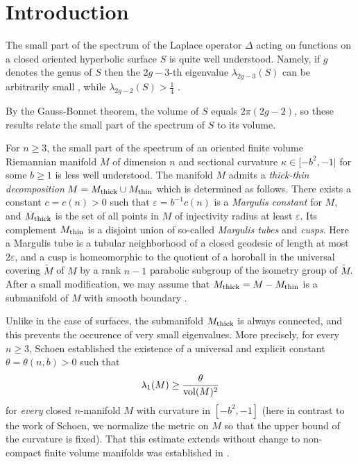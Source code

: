 \documentclass[11pt]{amsart}
\theoremstyle{plain}
\theoremstyle{plain}
\theoremstyle{definition}
\renewcommand{\epsilon}{\varepsilon}
\begin{document}

\section{Introduction}


The small part of the spectrum of the Laplace operator $\Delta$ acting on 
functions on a closed oriented 
hyperbolic surface $S$ is quite well understood. Namely,
if $g$ denotes the genus of $S$ then the $2g-3$-th eigenvalue 
$\lambda_{2g-3}(S)$ can be arbitrarily
small \cite{Bu}, while $\lambda_{2g-2}(S)>\frac{1}{4}$ \cite{OR09}.

By the Gauss-Bonnet theorem, the volume of $S$ equals $2\pi(2g-2)$, so
these results relate the small part of the spectrum of $S$ to its volume.

For $n\geq 3$, the small part of the spectrum of an oriented  
finite volume Riemannian 
manifold $M$ of dimension $n$ and 
sectional curvature $\kappa\in [-b^2,-1|$ for some $b\geq 1$ 
is less well understood. 
The manifold $M$ admits a \emph{thick-thin decomposition}
$M=M_{\rm thick}\cup M_{\rm thin}$ 
which is determined as follows. There exists a constant
$c=c(n)>0$ such that $\epsilon=b^{-1}c(n)$ is a \emph{Margulis constant} 
for $M$, and 
$M_{\rm thick}$ is the set of all points in $M$ of injectivity radius 
at least $\epsilon$. 
Its complement $M_{\rm thin}$ is a disjoint union of
so-called \emph{Margulis tubes} and \emph{cusps}. 
Here a Margulis tube is a tubular neighborhood of a closed geodesic 
of length at most $2\epsilon$, and a cusp is homeomorphic to the quotient of 
a horoball in the universal covering $\tilde M$ of $M$ 
by a rank $n-1$ parabolic subgroup of the isometry group of $\tilde M$. 
After a small modification, 
we may assume that
$M_{\rm thick}=M-M_{\rm thin}$ is a submanifold of $M$ with smooth boundary
\cite{BCD93}.

Unlike in the case of surfaces, 
the submanifold $M_{\rm thick}$ is always connected, and
this prevents the occurence of very small eigenvalues. 
More precisely, for every $n\geq 3$, 
Schoen \cite{S82} established the existence of a universal and explicit 
constant $\theta=\theta(n,b)>0$ such that
\begin{equation}\label{lower}\lambda_1(M)\geq 
\frac{\theta}{{\rm vol}(M)^2}\end{equation}
for \emph{every} closed $n$-manifold $M$ with curvature in 
$[-b^2,-1]$ (here in contrast to the work of Schoen, we 
normalize the metric on $M$ so that the upper bound 
of the curvature is fixed). That 
this estimate extends without
change to non-compact finite volume manifolds
was established in \cite{DR86,D87}.
\end{document}
